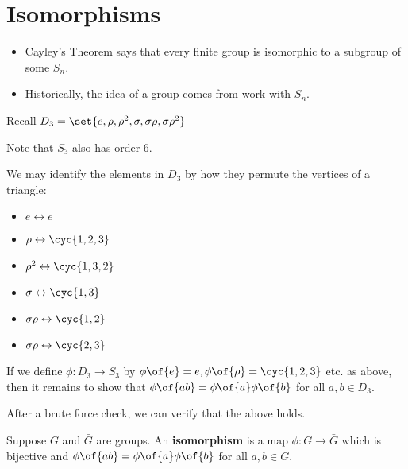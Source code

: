 \chapter{Isomorphisms}


\begin{remark}
    \begin{itemize}
        \item Cayley's Theorem says that every finite group is isomorphic to a subgroup of some $S_n$.
        \item Historically, the idea of a group comes from work with $S_n$.
    \end{itemize}
\end{remark}

\begin{example}
    Recall $D_3 = \set{e, \rho, \rho^2, \sigma, \sigma\rho, \sigma\rho^2}$

    Note that $S_3$ also has order 6.

    We may identify the elements in $D_3$ by how they permute the vertices of a triangle:
    \begin{itemize}
        \item $e \leftrightarrow e$
        \item $\rho \leftrightarrow \cyc{1,2,3}$
        \item $\rho^2 \leftrightarrow \cyc{1,3,2}$
        \item $\sigma \leftrightarrow \cyc{1,3}$
        \item $\sigma\rho \leftrightarrow \cyc{1,2}$
        \item $\sigma\rho \leftrightarrow \cyc{2,3}$
    \end{itemize}

    If we define $\phi: D_3 \to S_3$ by $\phi\of{e} = e, \phi\of{\rho} = \cyc{1,2,3}$ etc. as above, then it remains to show that $\phi\of{ab} = \phi\of{a} \phi\of{b}$ for all $a,b \in D_3$.

    After a brute force check, we can verify that the above holds.
\end{example}

\begin{definition}[an isomorphism]
    Suppose $G$ and $\bar{G}$ are groups. An \textbf{isomorphism} is a map $\phi:G \to \bar{G}$ which is bijective and $\phi\of{ab} = \phi\of{a} \phi\of{b}$ for all $a,b \in G$.
\end{definition}

